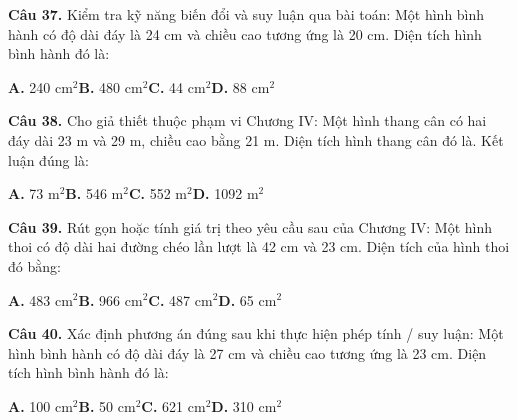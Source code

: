 \documentclass[11pt,a4paper]{article}
\begin{document}
\textbf{\color{primary} Câu 37.} Kiểm tra kỹ năng biến đổi và suy luận qua bài toán: Một hình bình hành có độ dài đáy là 24 cm và chiều cao tương ứng là 20 cm. Diện tích hình bình hành đó là:\par
\hspace*{1.5em}\textbf{A.} 240 cm$^2$\quad\quad \textbf{B.} 480 cm$^2$\quad\quad \textbf{C.} 44 cm$^2$\quad\quad \textbf{D.} 88 cm$^2$\par\vspace{2pt}
\textbf{\color{primary} Câu 38.} Cho giả thiết thuộc phạm vi Chương IV: Một hình thang cân có hai đáy dài 23 m và 29 m, chiều cao bằng 21 m. Diện tích hình thang cân đó là. Kết luận đúng là:\par
\hspace*{1.5em}\textbf{A.} 73 m$^2$\quad\quad \textbf{B.} 546 m$^2$\quad\quad \textbf{C.} 552 m$^2$\quad\quad \textbf{D.} 1092 m$^2$\par\vspace{2pt}
\textbf{\color{primary} Câu 39.} Rút gọn hoặc tính giá trị theo yêu cầu sau của Chương IV: Một hình thoi có độ dài hai đường chéo lần lượt là 42 cm và 23 cm. Diện tích của hình thoi đó bằng:\par
\hspace*{1.5em}\textbf{A.} 483 cm$^2$\quad\quad \textbf{B.} 966 cm$^2$\quad\quad \textbf{C.} 487 cm$^2$\quad\quad \textbf{D.} 65 cm$^2$\par\vspace{2pt}
\textbf{\color{primary} Câu 40.} Xác định phương án đúng sau khi thực hiện phép tính / suy luận: Một hình bình hành có độ dài đáy là 27 cm và chiều cao tương ứng là 23 cm. Diện tích hình bình hành đó là:\par
\hspace*{1.5em}\textbf{A.} 100 cm$^2$\quad\quad \textbf{B.} 50 cm$^2$\quad\quad \textbf{C.} 621 cm$^2$\quad\quad \textbf{D.} 310 cm$^2$\par\vspace{2pt}
\end{document}
